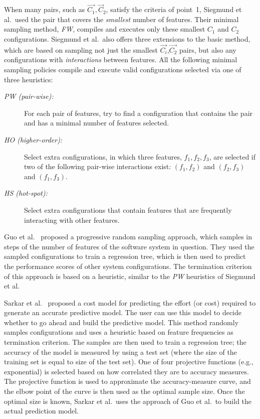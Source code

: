 \documentclass{newsig}
\begin{document}
When many pairs, such as ${\vec{C_1},\vec{C}_2}$, satisfy the criteria of point~1, Siegmund et al.\ used the 
pair that covers the {\em smallest} number of features. Their minimal sampling method, {\em FW},
compiles and executes only these smallest $C_1$ and $C_2$ configurations. 
Siegmund et al.\ also offers three extensions to the basic method, which are based on sampling
not just the smallest $\vec{C_i}$,$\vec{C_2}$  pairs, but also any configurations with {\em interactions} between features. 
All the following minimal sampling policies compile and   execute valid configurations selected via one of three heuristics:

\begin{description}
\item[{\em PW (pair-wise):}] For each pair of features, try to find a configuration that contains the pair and has a minimal number of features selected. 
\item[{\em HO (higher-order):}] Select extra configurations, in which three features, $f_1,f_2,f_3$, are selected if two of the following pair-wise interactions exist: $(f_1,f_2)$ and $(f_2,f_3)$ and $(f_1,f_3)$.
\item[{\em HS (hot-spot):}] Select extra configurations that contain features that are
frequently interacting with other features. 
\end{description}


Guo et al.~\cite{guo2013variability} proposed a progressive random sampling approach, which samples in steps of the number of features of the software system in question. They used the sampled configurations to train a regression tree, which is then used to predict the performance scores of other system configurations. The termination criterion of this approach is based on a heuristic, similar to the {\em PW} heuristics of Siegmund et al. 

Sarkar et al.~\cite{sarkar2015cost} proposed a cost model for predicting the effort (or cost) required to generate an accurate predictive model. The user can use this model to decide whether to go ahead and build the predictive model. This method randomly samples configurations and uses a heuristic based on feature frequencies as termination criterion. The samples are then used to train a regression tree; the accuracy of the model is measured by using a test set (where the size of the training set is equal to size of the test set). One of four projective functions (e.g., exponential) is selected based on how correlated they are to  accuracy measures. The projective function is used to approximate the accuracy-measure curve, and the elbow point of the curve is then used as the optimal sample size. Once the optimal size is known, Sarkar et al.\ uses the approach of Guo et al.\ to build the actual prediction model.  
\end{document}
